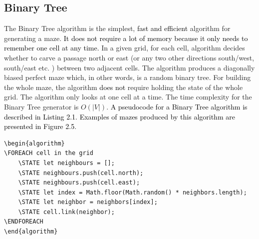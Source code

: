 \subsection{Binary Tree}
The Binary Tree algorithm \textcolor{black}{\cite{16}} is the simplest, \textcolor{black}{fast and efficient} algorithm for generating a maze. \textcolor{black}{It does not require a lot of memory because it only needs to remember one cell at any time.} In a given grid, for each cell, algorithm decides whether to carve a passage north or east (or any two other directions south/west, south/east etc. ) between two adjacent cells. The algorithm produces a diagonally biased perfect maze which, in other words, is a random binary tree. For building the whole maze, the algorithm \textcolor{black}{does not} require holding the state of the whole grid. The algorithm only looks at one cell at a time. The time complexity for the Binary Tree generator is $O(|V|)$. \textcolor{black}{A pseudocode for a Binary Tree algorithm is described in Listing 2.1. Examples of mazes produced by this algorithm are presented in Figure 2.5}.
\newline
\begin{lstlisting}[caption={Pseudocode for a Binary Tree Algorithm}]
\begin{algorithm}
\FOREACH cell in the grid
	\STATE let neighbours = [];
	\STATE neighbours.push(cell.north);
	\STATE neighbours.push(cell.east);
	\STATE let index = Math.floor(Math.random() * neighbors.length);
	\STATE let neighbor = neighbors[index];
	\STATE cell.link(neighbor);
\ENDFOREACH	
\end{algorithm}
\end{lstlisting}
\\
\newline
